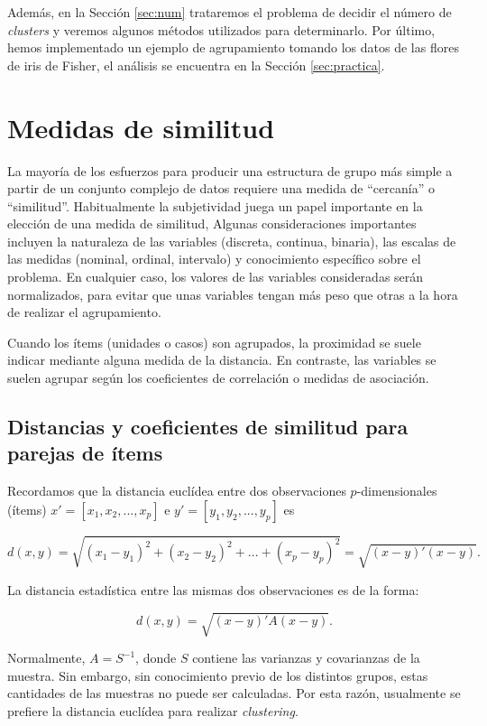 \documentclass[a4paper, 20pt]{article}
\begin{document}
Además, en la Sección \ref{sec:num} trataremos el problema de decidir el número de \textit{clusters} y veremos algunos métodos utilizados para determinarlo. Por último, hemos implementado un ejemplo de agrupamiento tomando los datos de las flores de iris de Fisher, el análisis se encuentra en la Sección \ref{sec:practica}. %

\section{Medidas de similitud}\label{sec:medidas}

La mayoría de los esfuerzos para producir una estructura de grupo más simple a partir de un conjunto complejo de datos requiere una medida de ``cercanía'' o  ``similitud''. Habitualmente la subjetividad juega un papel importante en la elección de una medida de similitud, Algunas consideraciones importantes incluyen la naturaleza de las variables (discreta, continua, binaria), las escalas de las medidas (nominal, ordinal, intervalo) y conocimiento específico sobre el problema. En cualquier caso, los valores de las variables consideradas serán normalizados, para evitar que unas variables tengan más peso que otras a la hora de realizar el agrupamiento.

Cuando los ítems (unidades o casos) son agrupados, la proximidad se suele indicar mediante alguna medida de la distancia. En contraste, las variables se suelen agrupar según los coeficientes de correlación o medidas de asociación.

\subsection{Distancias y coeficientes de similitud para parejas de ítems}

Recordamos que la distancia euclídea entre dos observaciones $p$-dimensionales (ítems) $x' = [x_1,x_2,...,x_p]$ e $y'=[y_1,y_2,...,y_p]$ es

\[d(x,y) = \sqrt{(x_1-y_1)^2+(x_2-y_2)^2+...+(x_p-y_p)^2}=\sqrt{(x-y)'(x-y)}.\]

La distancia estadística entre las mismas dos observaciones es de la forma:

$$d(x,y)=\sqrt{(x-y)'A(x-y)}. $$

Normalmente, $A=S^{-1}$, donde $S$ contiene las varianzas y covarianzas de la muestra. Sin embargo, sin conocimiento previo de los distintos grupos, estas cantidades de las muestras no puede ser calculadas. Por esta razón, usualmente se prefiere la distancia euclídea para realizar \textit{clustering}.\\
\end{document}
